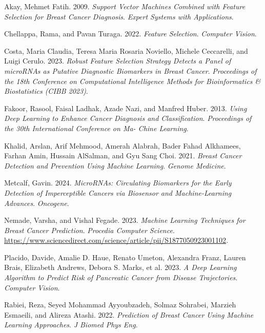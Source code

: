 \documentclass[
]{article}
\newlength{\cslhangindent}
\newlength{\cslentryspacingunit} %
\newenvironment{CSLReferences}[2] %
 {%
  \setlength{\parindent}{0pt}
  \ifodd #1
  \let\oldpar\par
  \def\par{\hangindent=\cslhangindent\oldpar}
  \fi
  \setlength{\parskip}{#2\cslentryspacingunit}
 }%
 {}
\begin{document}
\hypertarget{refs}{}
\begin{CSLReferences}{1}{0}
\leavevmode{}%
Akay, Mehmet Fatih. 2009. \emph{Support Vector Machines Combined with
Feature Selection for Breast Cancer Diagnosis}. \emph{Expert Systems
with Applications}.

\leavevmode{}%
Chellappa, Rama, and Pavan Turaga. 2022. \emph{Feature Selection}.
\emph{Computer Vision}.

\leavevmode{}%
Costa, Maria Claudia, Teresa Maria Rosaria Noviello, Michele Ceccarelli,
and Luigi Cerulo. 2023. \emph{Robust Feature Selection Strategy Detects
a Panel of microRNAs as Putative Diagnostic Biomarkers in Breast
Cancer}. \emph{Proceedings of the 18th Conference on Computational
Intelligence Methods for Bioinformatics \& Biostatistics (CIBB 2023)}.

\leavevmode{}%
Fakoor, Rasool, Faisal Ladhak, Azade Nazi, and Manfred Huber. 2013.
\emph{Using Deep Learning to Enhance Cancer Diagnosis and
Classification}. \emph{Proceedings of the 30th International Conference
on Ma- Chine Learning}.

\leavevmode{}%
Khalid, Arslan, Arif Mehmood, Amerah Alabrah, Bader Fahad Alkhamees,
Farhan Amin, Hussain AlSalman, and Gyu Sang Choi. 2021. \emph{Breast
Cancer Detection and Prevention Using Machine Learning}. \emph{Genome
Medicine}.

\leavevmode{}%
Metcalf, Gavin. 2024. \emph{MicroRNAs: Circulating Biomarkers for the
Early Detection of Imperceptible Cancers via Biosensor and
Machine-Learning Advances}. \emph{Oncogene}.

\leavevmode{}%
Nemade, Varsha, and Vishal Fegade. 2023. \emph{Machine Learning
Techniques for Breast Cancer Prediction}. \emph{Procedia Computer
Science}.
\url{https://www.sciencedirect.com/science/article/pii/S1877050923001102}.

\leavevmode{}%
Placido, Davide, Amalie D. Haue, Renato Umeton, Alexandra Franz, Lauren
Brais, Elizabeth Andrews, Debora S. Marks, et al. 2023. \emph{A Deep
Learning Algorithm to Predict Risk of Pancreatic Cancer from Disease
Trajectories}. \emph{Computer Vision}.

\leavevmode{}%
Rabiei, Reza, Seyed Mohammad Ayyoubzadeh, Solmaz Sohrabei, Marzieh
Esmaeili, and Alireza Atashi. 2022. \emph{Prediction of Breast Cancer
Using Machine Learning Approaches}. \emph{J Biomed Phys Eng}.


\end{CSLReferences}
\end{document}
